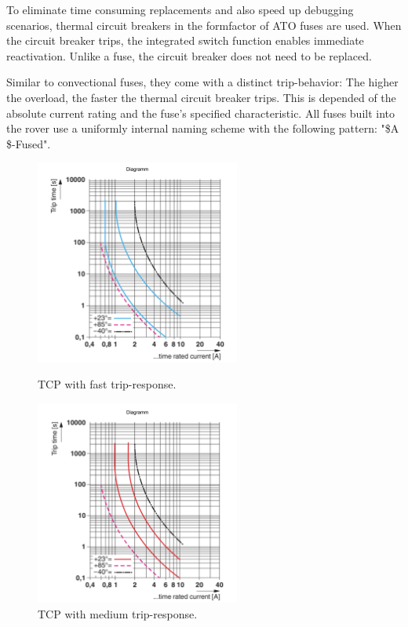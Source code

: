    \vspace{5mm} %

    To eliminate time consuming replacements and also speed up debugging scenarios, thermal circuit breakers in the formfactor of ATO fuses are used. When the circuit breaker trips, the integrated switch function enables immediate reactivation. Unlike a fuse, the circuit breaker does not need to be replaced. 

    \clearpage %
    
    Similar to convectional fuses, they come with a distinct trip-behavior: The higher the overload, the faster the thermal circuit breaker trips. This is depended of the absolute current rating and the fuse's specified characteristic. All fuses built into the rover use a uniformly internal naming scheme with the following pattern: "\$A \$-Fused". 

    \vspace{5mm} %
    
    \begin{figure} %
        \centering
        \includegraphics[width=0.6\textwidth]{contents/figures/f-type-fuse.png}
        \caption{TCP with fast trip-response.}
        \label{f-type}
        \includegraphics[width=0.6\textwidth]{contents/figures/m-type-fuse.png}
        \caption{TCP with medium trip-response.}
        \label{m-type}
    \end{figure}

